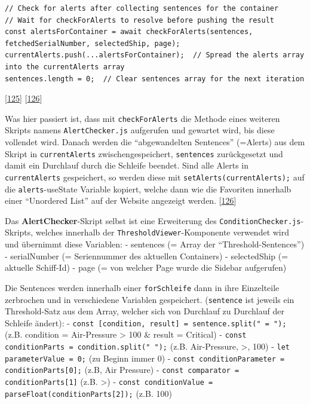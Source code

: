\documentclass[
    headings=optiontotocandhead,%
    twoside,
    numbers=noenddot,%
    12pt, %
    titlepage, %
    parskip=full, %
    listof=leveldown, 
    numbers=noenddot, %
    a4paper,DIV=14,
    BCOR=15mm,
]{scrbook}
\newcommand{\passthrough}[1]{#1}
\begin{document}
\begin{lstlisting}[caption={Aufruden des AlertChecker Skripts}]
// Check for alerts after collecting sentences for the container
// Wait for checkForAlerts to resolve before pushing the result
const alertsForContainer = await checkForAlerts(sentences, fetchedSerialNumber, selectedShip, page);
currentAlerts.push(...alertsForContainer);  // Spread the alerts array into the currentAlerts array
sentences.length = 0;  // Clear sentences array for the next iteration
\end{lstlisting}

{[}\protect\hyperlink{ref-gpt-FetchAndCheckFixEins}{125}{]}
{[}\protect\hyperlink{ref-gpt-FetchAndCheckFixZwei}{126}{]}

Was hier passiert ist, dass mit \passthrough{\lstinline!checkForAlerts!}
die Methode eines weiteren Skripts namens
\passthrough{\lstinline!AlertChecker.js!} aufgerufen und gewartet wird,
bis diese vollendet wird. Danach werden die ``abgewandelten Sentences''
(=Alerts) aus dem Skript in \passthrough{\lstinline!currentAlerts!}
zwischengespeichert, \passthrough{\lstinline!sentences!} zurückgesetzt
und damit ein Durchlauf durch die Schleife beendet. Sind alle Alerts in
\passthrough{\lstinline!currentAlerts!} gespeichert, so werden diese mit
\passthrough{\lstinline!setAlerts(currentAlerts);!} auf die
\passthrough{\lstinline!alerts!}-useState Variable kopiert, welche dann
wie die Favoriten innerhalb einer ``Unordered List'' auf der Website
angezeigt werden.
{[}\protect\hyperlink{ref-gpt-FetchAndCheckFixZwei}{126}{]}

Das \textbf{AlertChecker}-Skript selbst ist eine Erweiterung des
\passthrough{\lstinline!ConditionChecker.js!}-Skripts, welches innerhalb
der \passthrough{\lstinline!ThresholdViewer!}-Komponente verwendet wird
und übernimmt diese Variablen: - sentences (= Array der
``Threshold-Sentences'') - serialNumber (= Seriennummer des aktuellen
Containers) - selectedShip (= aktuelle Schiff-Id) - page (= von welcher
Page wurde die Sidebar aufgerufen)

Die Sentences werden innerhalb einer
\passthrough{\lstinline!forSchleife!} dann in ihre Einzelteile
zerbrochen und in verschiedene Variablen gespeichert.
(\passthrough{\lstinline!sentence!} ist jeweils ein Threshold-Satz aus
dem Array, welcher sich von Durchlauf zu Durchlauf der Schleife ändert):
-
\passthrough{\lstinline!const [condition, result] = sentence.split(" = ");!}
(z.B. condition = Air-Pressure \textgreater{} 100 \& result = Critical)
- \passthrough{\lstinline!const conditionParts = condition.split(" ");!}
(z.B. Air-Pressure, \textgreater, 100) -
\passthrough{\lstinline!let parameterValue = 0;!} (zu Beginn immer 0) -
\passthrough{\lstinline!const conditionParameter = conditionParts[0];!}
(z.B, Air Pressure) -
\passthrough{\lstinline!const comparator = conditionParts[1]!} (z.B.
\textgreater) -
\passthrough{\lstinline!const conditionValue = parseFloat(conditionParts[2]);!}
(z.B. 100)
\end{document}
